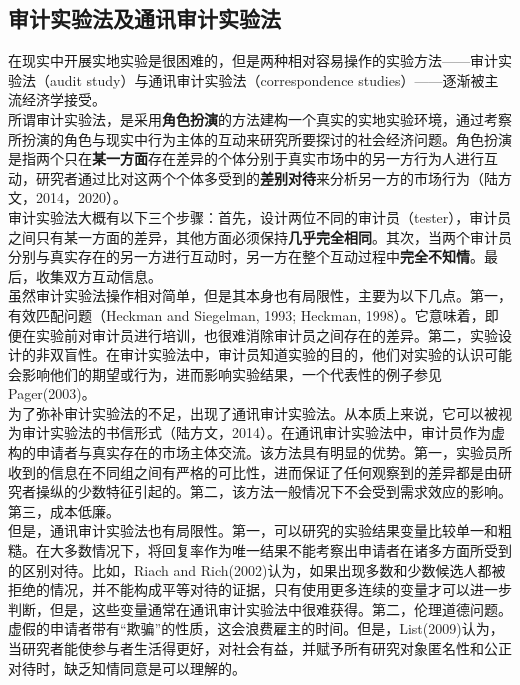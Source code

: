 \documentclass[a4paper]{article}
\begin{document}
	\subsection{审计实验法及通讯审计实验法}
	在现实中开展实地实验是很困难的，但是两种相对容易操作的实验方法——审计实验法（audit study）与通讯审计实验法（correspondence studies）——逐渐被主流经济学接受。
	\\[3pt]
	\indent
	所谓审计实验法，是采用\textbf{角色扮演}的方法建构一个真实的实地实验环境，通过考察所扮演的角色与现实中行为主体的互动来研究所要探讨的社会经济问题。角色扮演是指两个只在\textbf{某一方面}存在差异的个体分别于真实市场中的另一方行为人进行互动，研究者通过比对这两个个体多受到的\textbf{差别对待}来分析另一方的市场行为（陆方文，2014，2020）。
	\\[3pt]
	\indent
	审计实验法大概有以下三个步骤：首先，设计两位不同的审计员（tester），审计员之间只有某一方面的差异，其他方面必须保持\textbf{几乎完全相同}。其次，当两个审计员分别与真实存在的另一方进行互动时，另一方在整个互动过程中\textbf{完全不知情}。最后，收集双方互动信息。
	\\[3pt]
	\indent
	虽然审计实验法操作相对简单，但是其本身也有局限性，主要为以下几点。第一，有效匹配问题（Heckman and Siegelman, 1993; Heckman, 1998）。它意味着，即便在实验前对审计员进行培训，也很难消除审计员之间存在的差异。第二，实验设计的非双盲性。在审计实验法中，审计员知道实验的目的，他们对实验的认识可能会影响他们的期望或行为，进而影响实验结果，一个代表性的例子参见Pager(2003)。
	\\[3pt]
	\indent
	为了弥补审计实验法的不足，出现了通讯审计实验法。从本质上来说，它可以被视为审计实验法的书信形式（陆方文，2014）。在通讯审计实验法中，审计员作为虚构的申请者与真实存在的市场主体交流。该方法具有明显的优势。第一，实验员所收到的信息在不同组之间有严格的可比性，进而保证了任何观察到的差异都是由研究者操纵的少数特征引起的。第二，该方法一般情况下不会受到需求效应的影响。第三，成本低廉。
	\\[3pt]
	\indent
	但是，通讯审计实验法也有局限性。第一，可以研究的实验结果变量比较单一和粗糙。在大多数情况下，将回复率作为唯一结果不能考察出申请者在诸多方面所受到的区别对待。比如，Riach and Rich(2002)认为，如果出现多数和少数候选人都被拒绝的情况，并不能构成平等对待的证据，只有使用更多连续的变量才可以进一步判断，但是，这些变量通常在通讯审计实验法中很难获得。第二，伦理道德问题。虚假的申请者带有“欺骗”的性质，这会浪费雇主的时间。但是，List(2009)认为，当研究者能使参与者生活得更好，对社会有益，并赋予所有研究对象匿名性和公正对待时，缺乏知情同意是可以理解的。
	
\end{document}
